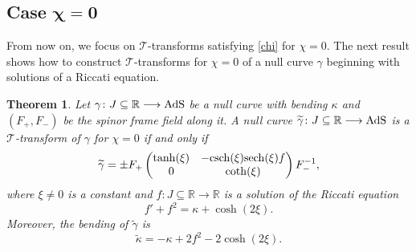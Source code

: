 \documentclass[pdftex]{sigma}
\numberwithin{equation}{section}
\newtheorem{Theorem}{Theorem}[section]
\def\bending{\kappa}
\def\R{\mathbb{R}}
\def\AdS{{\rm AdS}}
\def\sech{{\rm sech}}
\def\csch{{\rm csch}}
\begin{document}
\subsection[Case chi = 0]{Case $\boldsymbol{\chi=0}$}

From now on, we focus on $\mathcal{T}$-transforms satisfying \eqref{chi} for $\chi=0$. The next result shows how to construct $\mathcal{T}$-transforms for $\chi=0$ of a null curve $\gamma$ beginning with solutions of a Riccati equation.

\begin{Theorem}\label{T2} Let $\gamma\colon J\subseteq\R\longrightarrow\AdS$ be a null curve with bending $\bending$ and $(F_+,F_-)$ be the spinor frame field along it. A null curve $\widetilde{\gamma}\colon J\subseteq\R\longrightarrow \AdS$ is a $\mathcal{T}$-transform of $\gamma$ for $\chi=0$ if and only if
	\begin{equation}\label{gammatilda}
		\widetilde{\gamma}=\pm F_+\begin{pmatrix} \tanh(\xi) & -\csch(\xi)\sech(\xi)f \\ 0 & \coth(\xi) \end{pmatrix} F_-^{-1},
	\end{equation}
	where $\xi\neq 0$ is a constant and $f\colon J\subseteq\R\longrightarrow\R$ is a solution of the Riccati equation
	\begin{equation}\label{Riccati}
		f'+f^2=\bending+\cosh(2\xi).
	\end{equation}
	Moreover, the bending of $\widetilde{\gamma}$ is
	\begin{equation}\label{T2:f3}
		\widetilde{\bending}=-\bending+2f^2-2\cosh(2\xi).
	\end{equation}
\end{Theorem}
\end{document}
